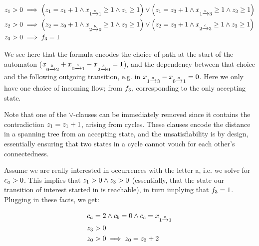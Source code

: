 \documentclass[acmsmall,review,anonymous,screen]{acmart}\settopmatter{printfolios=true,printccs=false,printacmref=true}
\theoremstyle{definition}
\begin{document}
\begin{equation}
\begin{aligned}
  &z_{1} > 0 \implies \left(z_{1} = z_{1} + 1 \land x_{1 \xrightarrow{c} 1} \geq 1 \land z_{1} \geq 1\right) \lor \left(z_{1} = z_{3} + 1 \land x_{1 \xrightarrow{a} 3} \geq 1 \land z_{3} \geq 1\right)\\
  &z_{2} > 0 \implies \left(z_{2} = z_{0} + 1 \land x_{2 \xrightarrow{b} 0} \geq 1 \land z_{0} \geq 1\right) \lor \left(z_{2} = z_{3} + 1 \land x_{2 \xrightarrow{c} 3} \geq 1 \land z_{3} \geq 1\right)\\
  &z_{3} > 0 \implies f_{3} = 1
  \end{aligned}
  \label{eq:parikh-formula}
  \end{equation}
    
  We see here that the formula encodes the choice of path at the start of the
  automaton ($x_{0 \xrightarrow{b} 2} +
  x_{0 \xrightarrow{a} 1} -
  x_{2 \xrightarrow{b} 0} = 1$), and the dependency between that
  choice and the following outgoing transition, e.g. in
  $x_{1 \xrightarrow{a} 3} -
  x_{0 \xrightarrow{a} 1} = 0$. Here we only have one choice of
  incoming flow; from $f_3$, corresponding to the only accepting
  state.


Note that one of the $\lor$-clauses can be immediately removed since it
contains the contradiction $z_{1} = z_{1} + 1$, arising from
cycles. These clauses encode the distance in a spanning tree from an accepting
state, and the unsatisfiability is by design, essentially ensuring that two
states in a cycle cannot vouch for each other's connectedness.

Assume we are really interested in occurrences with the letter a, i.e. we solve
for $c_a > 0$. This implies that $z_{1} > 0 \land z_{3}
> 0$ (essentially, that the state our transition of interest started in is
reachable), in turn implying that $f_3 = 1$. Plugging in these
facts, we get:

\begin{equation}
  \begin{aligned}
  &c_{a} = 2 \land c_{b} = 0 \land c_{c} = x_{1 \xrightarrow{c} 1}\\
  & z_{3} > 0\\
  &z_{0} > 0 \implies z_{0} = z_{3} + 2\\
  \end{aligned}
  \label{eq:parikh-formula-calc}
  \end{equation}
\end{document}
